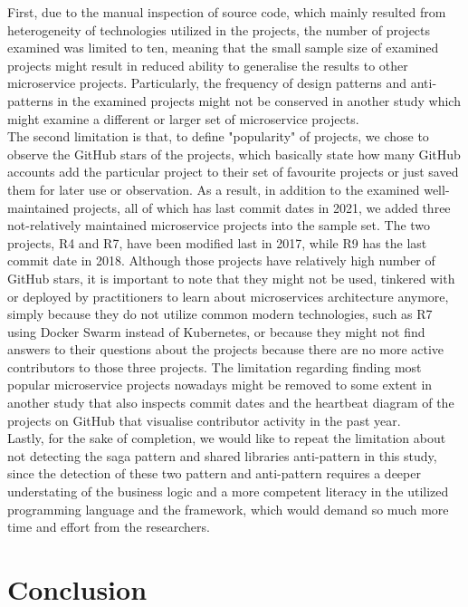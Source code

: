 \documentclass{Configuration_Files/PoliMi3i_thesis}
\begin{document}
First, due to the manual inspection of source code, which mainly resulted from heterogeneity of technologies utilized in the projects, the number of projects examined was limited to ten, meaning that the small sample size of examined projects might result in reduced ability to generalise the results to other microservice projects.
Particularly, the frequency of design patterns and anti-patterns in the examined projects might not be conserved in another study which might examine a different or larger set of microservice projects.
\\
The second limitation is that, to define "popularity" of projects, we chose to observe the GitHub stars of the projects, which basically state how many GitHub accounts add the particular project to their set of favourite projects or just saved them for later use or observation.
As a result, in addition to the examined well-maintained projects, all of which has last commit dates in 2021, we added three not-relatively maintained microservice projects into the sample set.
The two projects, R4 and R7, have been modified last in 2017, while R9 has the last commit date in 2018.
Although those projects have relatively high number of GitHub stars, it is important to note that they might not be used, tinkered with or deployed by practitioners to learn about microservices architecture anymore, simply because they do not utilize common modern technologies, such as R7 using Docker Swarm instead of Kubernetes, or because they might not find answers to their questions about the projects because there are no more active contributors to those three projects.
The limitation regarding finding most popular microservice projects nowadays might be removed to some extent in another study that also inspects commit dates and the heartbeat diagram of the projects on GitHub that visualise contributor activity in the past year.
\\
Lastly, for the sake of completion, we would like to repeat the limitation about not detecting the saga pattern and shared libraries anti-pattern in this study, since the detection of these two pattern and anti-pattern requires a deeper understating of the business logic and a more competent literacy in the utilized programming language and the framework, which would demand so much more time and effort from the researchers.


\chapter{Conclusion}
\label{ch:conclusion}%
\end{document}
